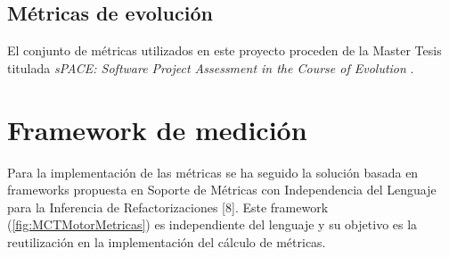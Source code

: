 \subsection{Métricas de evolución}
El conjunto de métricas utilizados en este proyecto proceden de la Master Tesis titulada \textit{sPACE: Software Project Assessment in the Course of Evolution} \cite{ratzinger_space:_2007}.

\section{Framework de medición}
Para la implementación de las métricas se ha seguido la solución basada en frameworks propuesta en Soporte de Métricas con Independencia del Lenguaje para la Inferencia de Refactorizaciones [8]. Este framework (\ref{fig:MCTMotorMetricas}) es independiente del lenguaje y su objetivo es la reutilización en la implementación del cálculo de métricas.

